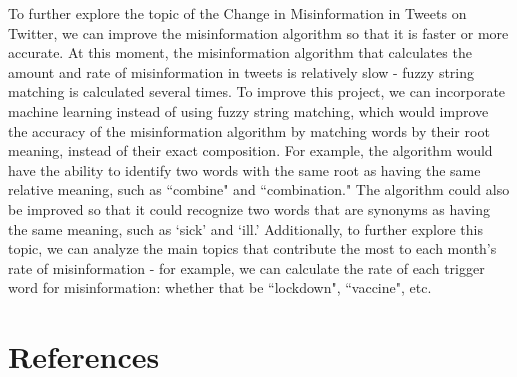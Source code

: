 \documentclass[fontsize=11pt]{article}
\begin{document}
\begin{flushleft}
        To further explore the topic of the Change in Misinformation in Tweets on Twitter, we can improve the misinformation algorithm so that it is faster or more accurate. At this moment, the misinformation algorithm that calculates the amount and rate of misinformation in tweets is relatively slow - fuzzy string matching is calculated several times. To improve this project, we can incorporate machine learning instead of using fuzzy string matching, which would improve the accuracy of the misinformation algorithm by matching words by their root meaning, instead of their exact composition. For example, the algorithm would have the ability to identify two words with the same root as having the same relative meaning, such as ``combine" and ``combination." The algorithm could also be improved so that it could recognize two words that are synonyms as having the same meaning, such as `sick' and `ill.' Additionally, to further explore this topic, we can analyze the main topics that contribute the most to each month's rate of misinformation - for example, we can calculate the rate of each trigger word for misinformation: whether that be ``lockdown", ``vaccine", etc.

    \end{flushleft}

    \section*{References}
\end{document}
